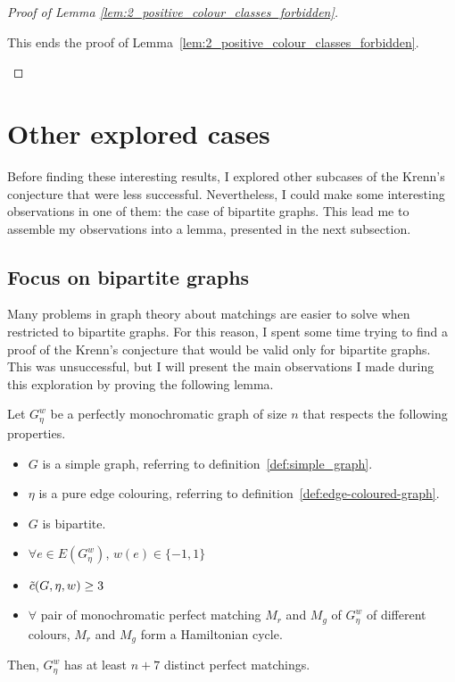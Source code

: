\begin{proof}[Proof of Lemma \ref{lem:2_positive_colour_classes_forbidden}]
\begin{enumerate}
            This ends the proof of Lemma~\ref{lem:2_positive_colour_classes_forbidden}.
    \end{enumerate}
\end{proof}


\section{Other explored cases}
\label{sec:other-explored-cases}

Before finding these interesting results, I explored other subcases of the Krenn's conjecture that were less successful.
Nevertheless, I could make some interesting observations in one of them: the case of bipartite graphs.
This lead me to assemble my observations into a lemma, presented in the next subsection.

\subsection{Focus on bipartite graphs}
\label{subsec:focus-on-bipartite-graphs}

Many problems in graph theory about matchings are easier to solve when restricted to bipartite graphs.
For this reason, I spent some time trying to find a proof of the Krenn's conjecture that would be valid only for bipartite graphs.
This was unsuccessful, but I will present the main observations I made during this exploration by proving the following lemma.

\begin{lemma}
    \label{lem:bipartite_graphs}
    Let $G_\eta^w$ be a perfectly monochromatic graph of size $n$ that respects the following properties.
    \begin{itemize}
        \item $G$ is a simple graph, referring to definition~\ref{def:simple_graph}.
        \item $\eta$ is a pure edge colouring, referring to definition~\ref{def:edge-coloured-graph}.
        \item $G$ is bipartite.
        \item $\forall e \in E(G_\eta^w)$, $w(e) \in \{-1, 1\}$
        \item $\Tilde{c}(G, \eta, w) \geq 3$
        \item $\forall$ pair of monochromatic perfect matching $M_r$ and $M_g$ of $G_\eta^w$ of different colours, $M_r$ and $M_g$ form a Hamiltonian cycle.
    \end{itemize}
    Then, $G_\eta^w$ has at least $n + 7$ distinct perfect matchings.
\end{lemma}

